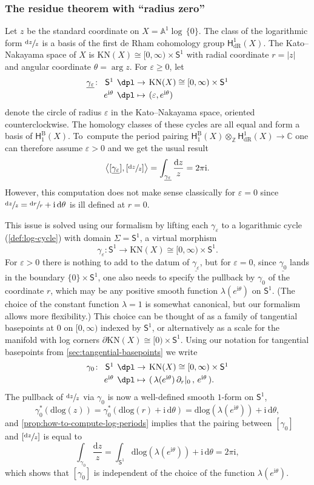 \documentclass[JEP,XML,SOM,Unicode,NoFloatCountersInSection,published]{cedram}
\let\oldbullet\bullet
\renewcommand{\bullet}{{\raisebox{1pt}{$\scriptscriptstyle\oldbullet$}}}
\newcommand\mto{\mathchoice{\longmapsto}{\mapsto}{\mapsto}{\mapsto}}
\newcommand{\dslog}[1]{\sfrac{\dd#1}{#1}}
\newcommand{\mapdef}[5]{\arraycolsep2pt
\begin{array}{crcl}
#1 \colon & #2 &\dpl\to & #3 \\[3pt]
& #4 &\dpl\mto& #5
\end{array}
}
\theoremstyle{definition}
\theoremstyle{remark}
\newcommand{\CC}{\mathbb{C}}
\newcommand{\ZZ}{\mathbb{Z}}
\newcommand{\AF}{\mathbb{A}}
\newcommand{\halfspc}[1]{[0,\infty)^{#1}}
\newcommand{\logcyl}{\AF^1 \log\, \{0\}}
\renewcommand{\ge}{\geqslant}
\newcommand{\iu}{\mathrm{i}}
\newcommand{\ipi}{\pi\iu }
\newcommand{\tipi}{2\ipi}
\let\epsilon\varepsilon
\newcommand{\abrac}[1]{\left\langle#1\right\rangle}
\newcommand{\sbrac}[1]{\left[#1\right]}
\newcommand{\dd}{\mathrm{d}}
\newcommand{\dlog}[1]{\frac{\dd#1}{#1}}
\newcommand{\Sig}{\Sigma}
\newcommand{\KN}[1]{\mathrm{KN}(#1)}
\newcommand{\HdR}[2][\bullet]{\mathsf{H}_{\mathrm{dR}}^{#1}(#2)}
\newcommand{\HlgyB}[2][\bullet]{\mathsf{H}^{\mathrm{B}}_{#1}(#2)}
\newcommand{\unitcirc}{\mathsf{S}^{1}}
\begin{document}
\subsubsection{The residue theorem with ``radius zero''}
Let $z$ be the standard coordinate on $X = \logcyl$. The class of the logarithmic form $\dslog{z}$ is a basis of the first de Rham cohomology group $\HdR[1]{X}$. The Kato--Nakayama space of $X$ is $\KN{X} \cong \halfspc{} \times \unitcirc$ with radial coordinate $r = |z|$ and angular coordinate $\theta = \arg z$. For $\epsilon \ge 0$, let
\[
\mapdef{\underline{\gamma_\epsilon}}{\unitcirc}{\KN{X}\cong [0,\infty)\times\unitcirc}{
e^{\iu\theta}}{(\epsilon, e^{\iu\theta})}
\]
denote the circle of radius $\epsilon$ in the Kato--Nakayama space, oriented counterclockwise. The homology classes of these cycles are all equal and form a basis of $\HlgyB[1]{X}$. To~compute the period pairing $\HlgyB[1]{X}\otimes_\ZZ \HdR[1]{X}\to\CC $ one can therefore assume $\varepsilon>0$ and we get the usual result
\[
\abrac{[\underline{\gamma_\epsilon}],\sbrac{\dslog{z}}} = \int_{\underline{\gamma_\epsilon}} \dlog{z} = \tipi.
\]
However, this computation does not make sense classically for $\epsilon=0$ since $\dslog{z}=\dslog{r}+\iu\,\dd\theta$ is ill defined at $r=0$.

This issue is solved using our formalism by lifting each $\gamma_\epsilon$ to a logarithmic cycle (\autoref{def:log-cycle}) with domain $\Sig=\unitcirc$, \ie a virtual morphism
\[
\gamma_\epsilon\colon\unitcirc\to \KN{X}\cong [0,\infty)\times\unitcirc.
\]
For $\epsilon>0$ there is nothing to add to the datum of $\underline{\gamma_\epsilon}$, but for $\varepsilon=0$, since $\underline{\gamma_0}$ lands in the boundary $\{0\}\times\unitcirc$, one also needs to specify the pullback by $\gamma_0$ of the coordinate $r$, which may be any positive smooth function $\lambda(e^{\iu\theta})$ on $\unitcirc$. (The choice of the constant function $\lambda=1$ is somewhat canonical, but our formalism allows more flexibility.) This choice can be thought of as a family of tangential basepoints at $0$ on $[0,\infty)$ indexed by $\unitcirc$, or alternatively as a scale for the manifold with log corners $\partial\KN{X}\cong [0)\times \unitcirc$. Using our notation for tangential basepoints from \autoref{sec:tangential-basepoints} we write
\[
\mapdef{\gamma_0}{\unitcirc}{\KN{X}\cong [0,\infty)\times\unitcirc}{
e^{\iu\theta}}{(\,\lambda(e^{\iu\theta})\,\partial_r|_0 \, , \, e^{\iu\theta}\, ).}
\]
The pullback of $\dslog{z}$ via $\gamma_0$ is now a well-defined smooth $1$-form on $\unitcirc$,
\[
\gamma_0^*\left(\mathrm{dlog}(z)\right)=\gamma_0^*\left(\mathrm{dlog}(r)+\iu\,\dd\theta\right)=\mathrm{dlog}(\lambda(e^{\iu\theta}))+\iu\,\dd\theta,
\]
and \autoref{prop:how-to-compute-log-periods} implies that the pairing between $[\gamma_0]$ and $[\dslog{z}]$ is equal to
\[
\int_{\gamma_0}\dlog{z} = \int_{\unitcirc}\mathrm{dlog}(\lambda(e^{\iu\theta}))+\iu\,\dd \theta =2\pi\iu,
\]
which shows that $[\gamma_0]$ is independent of the choice of the function $\lambda(e^{\iu\theta})$.
\end{document}
